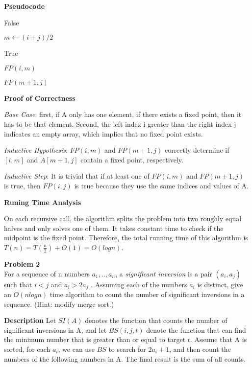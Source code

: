 \documentclass[12pt,article]{article}
\newenvironment{problem}[2][Problem]
    { \begin{mdframed}[backgroundcolor=gray!20] \textbf{#1 #2} \\}
    {  \end{mdframed}}
\begin{document}
\textbf{Pseudocode}

\begin{algorithm}
\caption{$FP(i,j)$}\label{alg:q2}
\begin{algorithmic}

        \Return False
    \EndIf

    \State $m \gets (i+j) / 2$


        \Return True

        \Return $FP(i,m)$
    \Else

        \Return $FP(m+1,j)$
    \EndIf

\end{algorithmic}
\end{algorithm}

\textbf{Proof of Correctness}

\textit{Base Case}: first, if A only has one element, if there exists a fixed point, then it has to be that element. Second, the left index i greater than the right index j indicates an empty array, which implies that no fixed point exists.

\textit{Inductive Hypothesis}: $FP(i,m)$ and $FP(m+1,j)$ correctly determine if $[i,m]$ and $A[m+1,j]$ contain a fixed point, respectively.

\textit{Inductive Step}: It is trivial that if at least one of $FP(i,m)$ and $FP(m+1,j)$ is true, then $FP(i,j)$ is true because they use the same indices and values of A.

\textbf{Runing Time Analysis}

On each recursive call, the algorithm splits the problem into two roughly equal halves and only solves one of them. It takes constant time to check if the midpoint is the fixed point. Therefore, the total running time of this algorithm is $T(n) = T(\frac{n}{2}) + O(1) = O(logn)$.

\newpage
\begin{problem}{2} 
For a sequence of n numbers $a_1, .., a_n$, a \textit{significant inversion} is a pair $(a_i, a_j)$ such that $i < j$ and $a_i > 2a_j$ . Assuming each of the numbers $a_i$ is distinct, give an $O(nlogn)$ time algorithm to count the number of significant inversions in a sequence. (Hint: modify merge sort.)
\end{problem}

\textbf{Description}
Let $SI(A)$ denotes the function that counts the number of significant inversions in A, and let $BS(i,j,t)$ denote the function that can find the minimum number that is greater than or equal to target $t$. Assume that A is sorted, for each $a_i$, we can use $BS$ to search for $2a_i + 1$, and then count the numbers of the following numbers in A. The final result is the sum of all counts.
\end{document}
